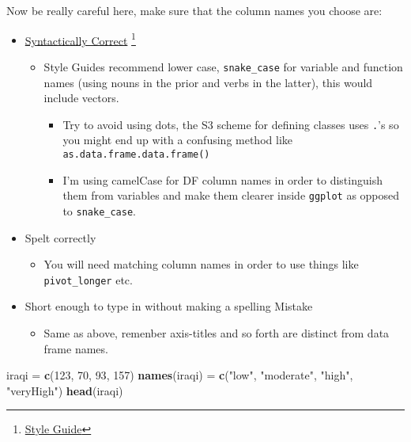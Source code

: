 \documentclass[
]{article}
\newenvironment{Shaded}{\begin{snugshade}}{\end{snugshade}}
\newcommand{\DecValTok}[1]{\textcolor[rgb]{0.00,0.00,0.81}{#1}}
\newcommand{\KeywordTok}[1]{\textcolor[rgb]{0.13,0.29,0.53}{\textbf{#1}}}
\newcommand{\NormalTok}[1]{#1}
\newcommand{\StringTok}[1]{\textcolor[rgb]{0.31,0.60,0.02}{#1}}
\providecommand{\tightlist}{%
  \setlength{\itemsep}{0pt}\setlength{\parskip}{0pt}}
\begin{document}
Now be really careful here, make sure that the column names you choose
are:

\begin{itemize}
\tightlist
\item
  \href{https://rdrr.io/r/base/make.names.html}{Syntactically Correct}
  \footnote{\href{http://r-pkgs.had.co.nz/style.html}{Style Guide}}

  \begin{itemize}
  \tightlist
  \item
    Style Guides recommend lower case, \texttt{snake\_case} for variable
    and function names (using nouns in the prior and verbs in the
    latter), this would include vectors.

    \begin{itemize}
    \tightlist
    \item
      Try to avoid using dots, the S3 scheme for defining classes uses
      \texttt{.}'s so you might end up with a confusing method like
      \texttt{as.data.frame.data.frame()}
    \item
      I'm using camelCase for DF column names in order to distinguish
      them from variables and make them clearer inside \texttt{ggplot}
      as opposed to \texttt{snake\_case}.
    \end{itemize}
  \end{itemize}
\item
  Spelt correctly

  \begin{itemize}
  \tightlist
  \item
    You will need matching column names in order to use things like
    \texttt{pivot\_longer} etc.
  \end{itemize}
\item
  Short enough to type in without making a spelling Mistake

  \begin{itemize}
  \tightlist
  \item
    Same as above, remenber axis-titles and so forth are distinct from
    data frame names.
  \end{itemize}
\end{itemize}

\begin{Shaded}
\begin{Highlighting}[]
\NormalTok{iraqi =}\StringTok{ }\KeywordTok{c}\NormalTok{(}\DecValTok{123}\NormalTok{, }\DecValTok{70}\NormalTok{, }\DecValTok{93}\NormalTok{, }\DecValTok{157}\NormalTok{)}
\KeywordTok{names}\NormalTok{(iraqi) =}\StringTok{ }\KeywordTok{c}\NormalTok{(}\StringTok{"low"}\NormalTok{, }\StringTok{"moderate"}\NormalTok{, }\StringTok{"high"}\NormalTok{, }\StringTok{"veryHigh"}\NormalTok{)}
\KeywordTok{head}\NormalTok{(iraqi)}
\end{Highlighting}
\end{Shaded}
\end{document}
